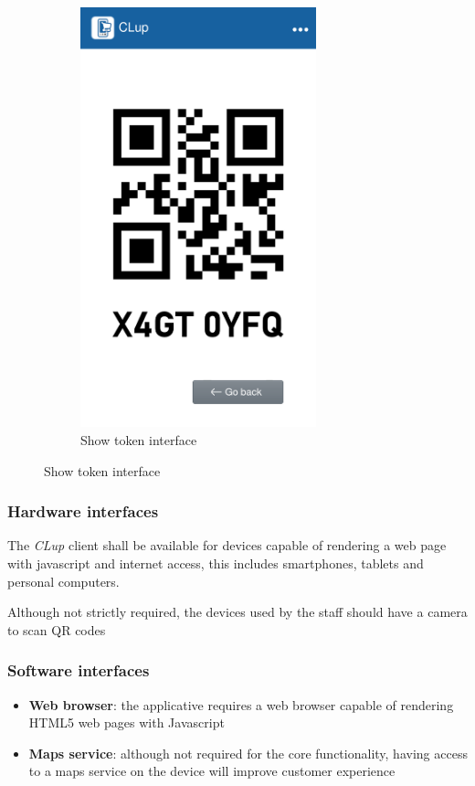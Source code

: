 \begin{figure}[H]
\begin{subfigure}{0.5\textwidth}
        \includegraphics[width=0.75\textwidth]{Images/token-mockup.png}
        \caption{Show token interface}
    \end{subfigure}
\end{figure}


\subsubsection{Hardware interfaces}
The \emph{CLup} client shall be available for devices capable of rendering a web page with javascript and internet access, this includes smartphones, tablets and personal computers.

Although not strictly required, the devices used by the staff should have a camera to scan QR codes

\subsubsection{Software interfaces}
\begin{itemize}
    \item \textbf{Web browser}: the applicative requires a web browser capable of rendering HTML5 web pages with Javascript
    \item \textbf{Maps service}: although not required for the core functionality, having access to a maps service on the device will improve customer experience
\end{itemize}

